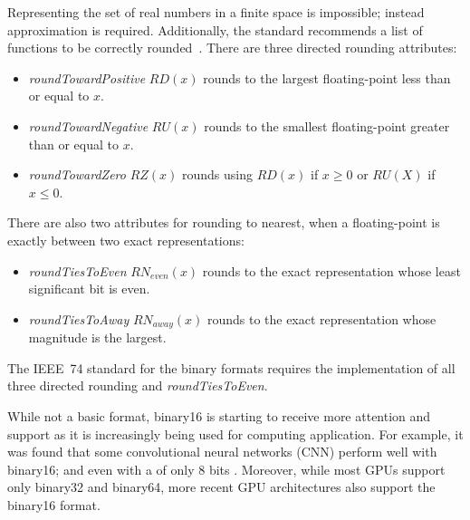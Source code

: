 Representing the set of real numbers in a finite space is impossible; instead approximation is required.
Additionally, the standard recommends a list of functions to be correctly rounded~\cite{ieee754_2008-ev}.
There are three directed rounding attributes:
\begin{itemize}
	\item \textit{roundTowardPositive} $RD(x)$ rounds to the largest floating-point less than or equal to $x$.
	\item \textit{roundTowardNegative} $RU(x)$ rounds to the smallest floating-point greater than or equal to $x$.
	\item \textit{roundTowardZero} $RZ(x)$ rounds using $RD(x)$ if $x \ge 0$ or $RU(X)$ if $x \le 0$.
\end{itemize}
There are also two attributes for rounding to nearest, when a floating-point is exactly between two exact representations:
\begin{itemize}
	\item \textit{roundTiesToEven} $RN_{even}(x)$ rounds to the exact representation whose least significant bit is even.
	\item \textit{roundTiesToAway} $RN_{away}(x)$ rounds to the exact representation whose magnitude is the largest.
\end{itemize}
The IEEE~74 standard for the binary formats requires the implementation of all three directed rounding and \textit{roundTiesToEven}.
						
While not a basic format, binary16 is starting to receive more attention and support as it is increasingly being used for computing application.
For example, it was found that some convolutional neural networks (CNN) perform well with binary16; and even with a  of only 8 bits .
Moreover, while most GPUs support only binary32 and binary64, more recent GPU architectures also support the binary16 format.
